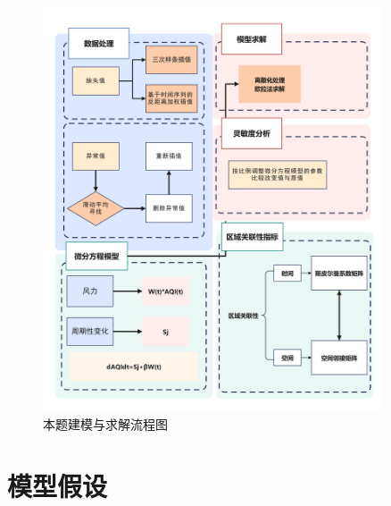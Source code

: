 \documentclass[a4paper,12pt]{article}
\begin{document}
	\begin{center}
		\begin{figure}[htbp]
			\includegraphics[width=0.9\textwidth]{流程图.png}
			\caption{本题建模与求解流程图}
			\label{fig:model_flow}
		\end{figure}
	\end{center}
	
	\section{模型假设}
	
\end{document}
